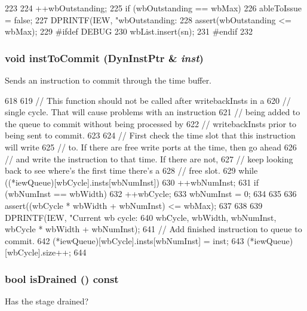 \begin{DoxyCode}
223     {
224         ++wbOutstanding;
225         if (wbOutstanding == wbMax)
226             ableToIssue = false;
227         DPRINTF(IEW, "wbOutstanding: %
228         assert(wbOutstanding <= wbMax);
229 #ifdef DEBUG
230         wbList.insert(sn);
231 #endif
232     }
\end{DoxyCode}
\hypertarget{classDefaultIEW_a720e9865ffa6e84b756f5ec1d1a24d94}{
\subsubsection[{instToCommit}]{\setlength{\rightskip}{0pt plus 5cm}void instToCommit ({\bf DynInstPtr} \& {\em inst})}}
\label{classDefaultIEW_a720e9865ffa6e84b756f5ec1d1a24d94}
Sends an instruction to commit through the time buffer. 


\begin{DoxyCode}
618 {
619     // This function should not be called after writebackInsts in a
620     // single cycle.  That will cause problems with an instruction
621     // being added to the queue to commit without being processed by
622     // writebackInsts prior to being sent to commit.
623 
624     // First check the time slot that this instruction will write
625     // to.  If there are free write ports at the time, then go ahead
626     // and write the instruction to that time.  If there are not,
627     // keep looking back to see where's the first time there's a
628     // free slot.
629     while ((*iewQueue)[wbCycle].insts[wbNumInst]) {
630         ++wbNumInst;
631         if (wbNumInst == wbWidth) {
632             ++wbCycle;
633             wbNumInst = 0;
634         }
635 
636         assert((wbCycle * wbWidth + wbNumInst) <= wbMax);
637     }
638 
639     DPRINTF(IEW, "Current wb cycle: %
640             wbCycle, wbWidth, wbNumInst, wbCycle * wbWidth + wbNumInst);
641     // Add finished instruction to queue to commit.
642     (*iewQueue)[wbCycle].insts[wbNumInst] = inst;
643     (*iewQueue)[wbCycle].size++;
644 }
\end{DoxyCode}
\hypertarget{classDefaultIEW_adf5473c18a3d7c1e88c4a2072bce5526}{
\subsubsection[{isDrained}]{\setlength{\rightskip}{0pt plus 5cm}bool isDrained () const}}
\label{classDefaultIEW_adf5473c18a3d7c1e88c4a2072bce5526}
Has the stage drained? 


